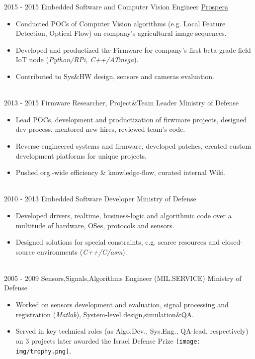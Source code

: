\documentclass[letterpaper]{twentysecondcv_af} %
\begin{document}
\begin{twenty}
   	{2015 	-} {2015}		
        {Embedded Software and Computer Vision Engineer}
        {\color{blue}   \href{http://www.prospera.com/}{Prospera}}
        {}
        {
        \begin{itemize}
        \item Conducted POCs of Computer Vision algorithms (e.g. Local Feature Detection, Optical Flow) on company's agricultural image sequences.
        \item Developed and productized the Firmware for company's first beta-grade field IoT node (\textit{Python/RPi, C++/ATmega}).
        \item Contributed to Sys\&HW design, sensors and cameras evaluation.            
         \end{itemize}
        }
      \\
      \twentyitem
      {2013 	-} {2015}		
      {Firmware Researcher, Project\&Team Leader}
      {{Ministry of Defense}}
      {}
      {
      \begin{itemize}
      \item Lead POCs, development and productization of firwmare projects, designed dev process, mentored new hires, reviewed team's code.
      \item Reverse-engineered systems and firmware, developed patches, created custom development platforms for unique projects.      
      \item Pushed org.-wide efficiency \& knowledge-flow, curated internal Wiki.
    \end{itemize}
    	}
    
     \\
      \twentyitem
      {2010 	-} {2013}		
      {Embedded Software Developer}
      {{Ministry of Defense}}
      {}
      {
      \begin{itemize}
      \item Developed drivers, realtime, business-logic and algorithmic code over a multitude of hardware, OSes, protocols and sensors.
      \item Designed solutions for special constraints, e.g. scarce resources and closed-source environments (\textit{C++/C/asm}). 
    \end{itemize}
    	}
    	
    	 \\
      \twentyitem
      {2005 	-} {2009}		
      {Sensors,Signals,Algorithms Engineer (MIL.SERVICE)}
      {{Ministry of Defense}}
      {}
      {
      \begin{itemize}      
      \item Worked on sensors development and evaluation, signal processing and registration (\textit{Matlab}), System-level design,simulation\&QA.
      \item Served in key technical roles (as Algo.Dev., Sys.Eng., QA-lead, respectively) on 3 projects later awarded the Israel Defense Prize {\texttt{[image: img/trophy.png]}}.
    \end{itemize}
    	}
 \end{twenty}
 
\end{document}
